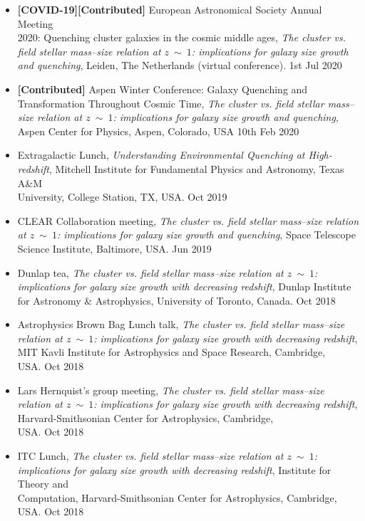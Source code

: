 \documentclass[11pt]{article}
\newenvironment{innerlist}[1][\enskip\textbullet]%
        {\begin{itemize}[#1,leftmargin=*,parsep=0pt,itemsep=0pt,topsep=0pt,partopsep=0pt]}
        {\end{itemize}}
\begin{document}
\begin{innerlist}
\item \textbf{[COVID-19][Contributed]} European Astronomical Society Annual Meeting\\ 2020: Quenching cluster galaxies in the cosmic middle ages, {\it The cluster vs. field stellar mass--size relation at $z~\mathtt{\sim}~1$: implications for galaxy size growth and quenching}, Leiden, The Netherlands (virtual conference). \hfill 1st Jul 2020
\item \textbf{[Contributed]} Aspen Winter Conference: Galaxy Quenching and \\Transformation Throughout Cosmic Time, {\it The cluster vs. field stellar mass--size relation at $z~\mathtt{\sim}~1$: implications for galaxy size growth and quenching}, Aspen Center for Physics, Aspen, Colorado, USA \hfill 10th Feb 2020
\item Extragalactic Lunch, {\it Understanding Environmental Quenching at High-redshift}, Mitchell Institute for Fundamental Physics and Astronomy, Texas A\&M \\University, College Station, TX, USA. \hfill Oct 2019
\item CLEAR Collaboration meeting, {\it The cluster vs. field stellar mass--size relation at $z~\mathtt{\sim}~1$: implications for galaxy size growth and quenching}, Space Telescope Science Institute, Baltimore, USA. \hfill Jun 2019
\item Dunlap tea, {\it The cluster vs. field stellar mass--size relation at $z~\mathtt{\sim}~1$: implications for galaxy size growth with decreasing redshift}, Dunlap Institute for Astronomy \& Astrophysics, University of Toronto, Canada. \hfill Oct 2018
\item Astrophysics Brown Bag Lunch talk,  {\it The cluster vs. field stellar mass--size relation at $z~\mathtt{\sim}~1$: implications for galaxy size growth with decreasing redshift}, MIT Kavli Institute for Astrophysics and Space Research, Cambridge, \\USA. \hfill Oct 2018
\item Lars Hernquist's group meeting, {\it The cluster vs. field stellar mass--size relation at $z~\mathtt{\sim}~1$: implications for galaxy size growth with decreasing redshift}, Harvard-Smithsonian Center for Astrophysics, Cambridge, \\USA. \hfill Oct 2018
\item ITC Lunch, {\it The cluster vs. field stellar mass--size relation at $z~\mathtt{\sim}~1$: implications for galaxy size growth with decreasing redshift}, Institute for Theory and\\ Computation, Harvard-Smithsonian Center for Astrophysics, Cambridge,\\ USA. \hfill Oct 2018

\end{innerlist}
\end{document}
